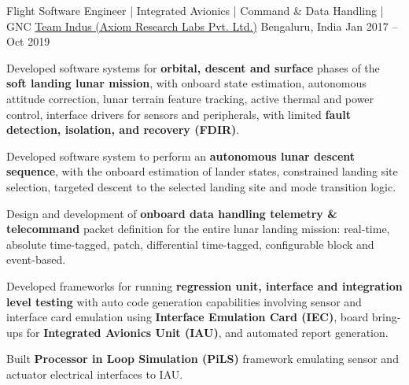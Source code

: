 \begin{cventries}
	\cventry
	{Flight Software Engineer | Integrated Avionics | Command \& Data Handling | GNC}
	{\href{http://www.teamindus.in/}{Team Indus (Axiom Research Labs Pvt. Ltd.)}}
	{Bengaluru, India}
	{Jan 2017 -- Oct 2019}
	{
		\begin{cvitems}
		\item{Developed software systems for \textbf{orbital, descent and surface} phases of the \textbf{soft landing lunar mission}, with onboard state estimation, autonomous attitude correction, lunar terrain feature tracking, active thermal and power control, interface drivers for sensors and peripherals, with limited \textbf{fault detection, isolation, and recovery (FDIR)}.}
		\vspace{3pt}
		\item{Developed software system to perform an \textbf{autonomous lunar descent sequence}, with the onboard estimation of lander states, constrained landing site selection, targeted descent to the selected landing site and mode transition logic.}
		\vspace{3pt}
		\item{Design and development of \textbf{onboard data handling telemetry \& telecommand} packet definition for the entire lunar landing mission: real-time, absolute time-tagged, patch, differential time-tagged, configurable block and event-based.}
		\vspace{3pt}
		\item{Developed frameworks for running \textbf{regression unit, interface and integration level testing} with auto code generation capabilities involving sensor and interface card emulation using \textbf{Interface Emulation Card (IEC)}, board bring-ups for \textbf{Integrated Avionics Unit (IAU)}, and automated report generation.}
		\vspace{3pt}
		\item{Built \textbf{Processor in Loop Simulation (PiLS)} framework emulating sensor and actuator electrical interfaces to IAU.}
		\end{cvitems}
	}
\end{cventries}
